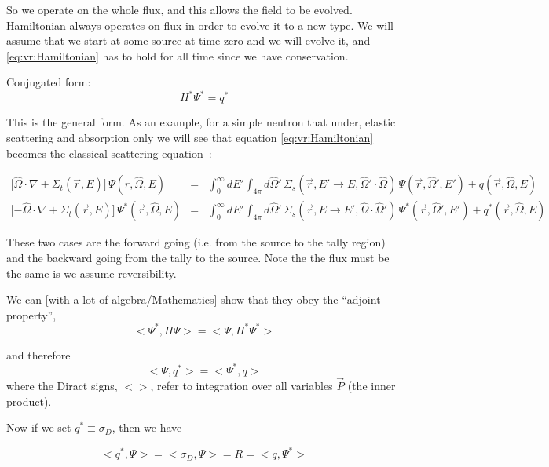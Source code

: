 So we operate on the whole flux, and this allows the field to be evolved.
Hamiltonian always operates on flux in order to evolve it to a new type.
We will assume that we start at some source at time zero and we will evolve it, and \eqref{eq:vr:Hamiltonian} has to
hold for all time since we have conservation.

Conjugated form:
\begin{equation}
  H^* \Psi^*  =  q^* 
\end{equation}

This is the general form. As an example, for a simple neutron that under,
elastic scattering and absorption only we will see that equation \eqref{eq:vr:Hamiltonian} becomes
the classical  scattering equation~\cite[Eq.\,1]{arXiv:1612.00793}:

\begin{eqnarray}
  \lbrack\hat\Omega \cdot \nabla + \Sigma_t(\vec{r},E)\rbrack \, \Psi(r,\hat\Omega,E) & = & \int^\infty_0 dE' \int_{4\pi}
  d\hat\Omega' \, \Sigma_s(\vec{r},E' \to E,\hat\Omega' \cdot \hat\Omega) \, \Psi(\vec{r},\hat\Omega',E') + q(\vec{r},\hat\Omega,E) \\
  \lbrack-\hat\Omega \cdot \nabla + \Sigma_t(\vec{r},E)\rbrack \, \Psi^*(\vec{r},\hat\Omega,E) & = & \int^\infty_0 dE' \int_{4\pi}
  d\hat\Omega' \, \Sigma_s(\vec{r},E \to E',\hat\Omega \cdot \hat\Omega') \, \Psi^*(\vec{r},\hat\Omega',E') + q^*(\vec{r},\hat\Omega,E) 
\end{eqnarray}


These two cases are the forward going (i.e. from the source to the tally region) and the backward going from the
tally to the source. Note the the flux must be the same is we assume reversibility.

We can [with a lot of algebra/Mathematics] show that they obey the ``adjoint property'',
\begin{equation}
  < \Psi^*,H\Psi >  =  <\Psi, H^*\Psi^*> 
\end{equation}

and therefore 
\begin{equation}
  <\Psi,q^*>   =  <\Psi^*,q> 
\end{equation}
where the Diract signs, $< >$, refer to integration over all variables $\vec{P}$ (the inner product).

Now if we set $q^* \equiv \sigma_D$, then we have

\begin{equation}
<q^*,\Psi>  = <\sigma_D,\Psi>  =  R = <q,\Psi^*> 
\end{equation}

